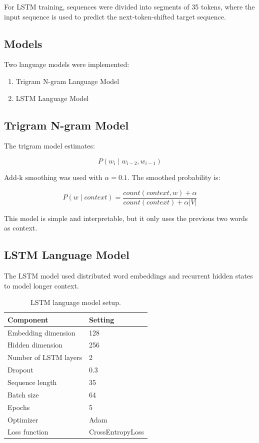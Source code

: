 \documentclass[11pt,a4paper]{article}
\begin{document}
For LSTM training, sequences were divided into segments of 35 tokens, where the input sequence is used to predict the next-token-shifted target sequence.

\subsection{Models}

Two language models were implemented:

\begin{enumerate}[leftmargin=*]
    \item Trigram N-gram Language Model
    \item LSTM Language Model
\end{enumerate}

\subsection{Trigram N-gram Model}

The trigram model estimates:

\begin{equation}
P(w_i \mid w_{i-2}, w_{i-1})
\end{equation}

Add-k smoothing was used with $\alpha=0.1$. The smoothed probability is:

\begin{equation}
P(w \mid context) = \frac{count(context, w) + \alpha}{count(context) + \alpha |V|}
\end{equation}

This model is simple and interpretable, but it only uses the previous two words as context.

\subsection{LSTM Language Model}

The LSTM model used distributed word embeddings and recurrent hidden states to model longer context.

\begin{table}[H]
\centering
\caption{LSTM language model setup.}
\begin{tabular}{ll}
\toprule
Component & Setting \\
\midrule
Embedding dimension & 128 \\
Hidden dimension & 256 \\
Number of LSTM layers & 2 \\
Dropout & 0.3 \\
Sequence length & 35 \\
Batch size & 64 \\
Epochs & 5 \\
Optimizer & Adam \\
Loss function & CrossEntropyLoss \\
\bottomrule
\end{tabular}
\end{table}
\end{document}
